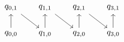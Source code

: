 
\[
  \begin{tikzcd}[row sep=1.7em, column sep=1.7em]
    q_{0,1} \arrow[dr] & q_{1,1} \arrow[dr] & q_{2,1} \arrow[dr] & q_{3,1} \\
    q_{0,0} \arrow[u]  & q_{1,0} \arrow[u]  & q_{2,0} \arrow[u]  & q_{3,0} \arrow[u]
  \end{tikzcd}
\]